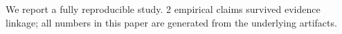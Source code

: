 We report a fully reproducible study. 2 empirical claims survived evidence linkage; all numbers in this paper are generated from the underlying artifacts.
